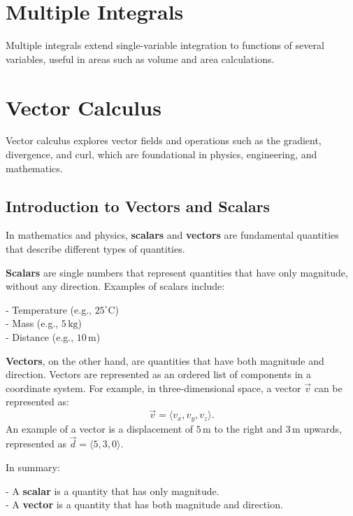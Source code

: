 \documentclass[a4paper,12pt,openany]{book}
\begin{document}

\chapter{Multiple Integrals}
Multiple integrals extend single-variable integration to functions of several variables, useful in areas such as volume and area calculations.


\chapter{Vector Calculus}
Vector calculus explores vector fields and operations such as the gradient, divergence, and curl, which are foundational in physics, engineering, and mathematics.

\section{Introduction to Vectors and Scalars}
In mathematics and physics, \textbf{scalars} and \textbf{vectors} are fundamental quantities that describe different types of quantities.

\textbf{Scalars} are single numbers that represent quantities that have only magnitude, without any direction. Examples of scalars include:

- Temperature (e.g., \(25^\circ \text{C}\))\\
- Mass (e.g., \(5 \, \text{kg}\))\\
- Distance (e.g., \(10 \, \text{m}\))

\textbf{Vectors}, on the other hand, are quantities that have both magnitude and direction. Vectors are represented as an ordered list of components in a coordinate system. For example, in three-dimensional space, a vector \(\vec{v}\) can be represented as:
\[
\vec{v} = \langle v_x, v_y, v_z \rangle.
\]
An example of a vector is a displacement of \(5 \, \text{m}\) to the right and \(3 \, \text{m}\) upwards, represented as \(\vec{d} = \langle 5, 3, 0 \rangle\).

In summary:

- A \textbf{scalar} is a quantity that has only magnitude.\\
- A \textbf{vector} is a quantity that has both magnitude and direction.
\end{document}
